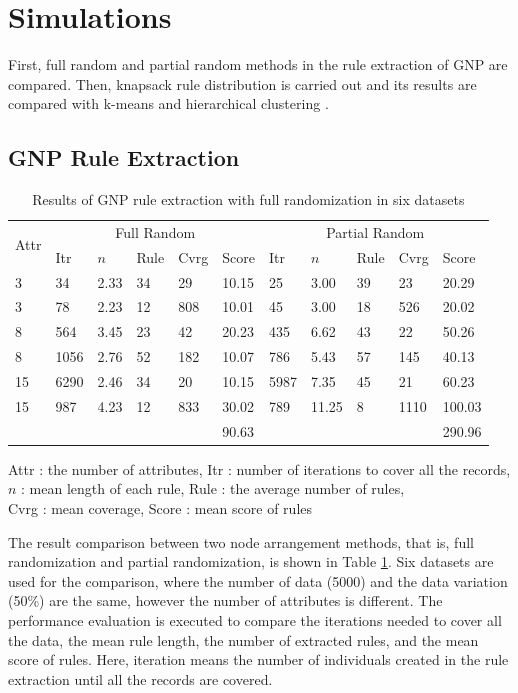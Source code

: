 \documentclass{elsart}
\begin{document}
\section{Simulations}
First, full random and partial random methods in the rule extraction of GNP are compared. Then, knapsack rule distribution is carried out and its results are compared with k-means and hierarchical clustering \cite{silhouette}.

\subsection{GNP Rule Extraction}

\begin{table}[tb]
\caption{\label{gnp-rule-extraction-result-full}Results of GNP rule extraction
with full randomization in six datasets}


\begin{raggedright}
\begin{tabular}{|l|l|l|l|l|l|l|l|l|l|l|}
\hline 
\multirow{2}{*}{Attr} & \multicolumn{5}{c|}{Full Random} & \multicolumn{5}{c|}{Partial Random}\tabularnewline
\cline{2-11} 
 & Itr  & $n$  & Rule  & Cvrg  & Score  & Itr  & $n$  & Rule  & Cvrg  & Score\tabularnewline
\hline 
3  & 34  & 2.33  & 34  & 29  & 10.15  & 25  & 3.00  & 39  & 23  & 20.29\tabularnewline
\hline 
3  & 78  & 2.23  & 12  & 808  & 10.01  & 45  & 3.00  & 18  & 526  & 20.02\tabularnewline
\hline 
8  & 564  & 3.45  & 23  & 42  & 20.23  & 435  & 6.62  & 43  & 22  & 50.26\tabularnewline
\hline 
8  & 1056  & 2.76  & 52  & 182  & 10.07  & 786  & 5.43  & 57  & 145  & 40.13\tabularnewline
\hline 
15  & 6290  & 2.46  & 34  & 20  & 10.15  & 5987  & 7.35  & 45  & 21  & 60.23\tabularnewline
\hline 
15  & 987  & 4.23  & 12  & 833  & 30.02  & 789  & 11.25  & 8  & 1110  & 100.03\tabularnewline
\hline 
\multicolumn{5}{|l|}{} & 90.63  & \multicolumn{4}{l|}{} & 290.96\tabularnewline
\hline 
\end{tabular}
\par\end{raggedright}

Attr : the number of attributes, Itr : number of iterations to cover all the records, \\ $n$ : mean length of each rule, Rule : the average number of rules, \\
Cvrg : mean coverage, Score : mean score of rules 
\end{table}

The result comparison between two node arrangement methods, that is, full randomization and partial randomization, is shown in Table \ref{gnp-rule-extraction-result-full}. Six datasets are used for the comparison, where the number of data (5000) and the data variation (50\%) are the same, however the number of attributes is different. The performance evaluation is executed to compare the iterations needed to cover all the data, 
the mean rule length,
the number of extracted rules, 
and the mean score of rules.
Here, iteration means the number of individuals created in the rule extraction until all the records are covered.
\end{document}
